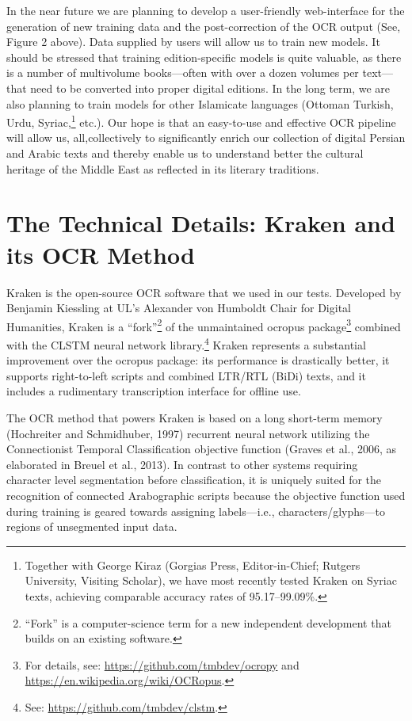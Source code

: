 In the near future we are planning to develop a user-friendly web-interface for
the generation of new training data and the post-correction of the OCR output
(See, Figure 2 above). Data supplied by users will allow us to train new
models. It should be stressed that training edition-specific models is quite
valuable, as there is a number of multivolume books—often with over a dozen
volumes per text—that need to be converted into proper digital editions. In the
long term, we are also planning to train models for other Islamicate languages
(Ottoman Turkish, Urdu, Syriac,\footnote{Together with George Kiraz (Gorgias
Press, Editor-in-Chief; Rutgers University, Visiting Scholar), we have most
recently tested Kraken on Syriac texts, achieving comparable accuracy rates of
95.17–99.09\%.} etc.). Our hope is that an easy-to-use and effective OCR
pipeline will allow us, all,collectively to significantly enrich our collection
of digital Persian and Arabic texts and thereby enable us to understand better
the cultural heritage of the Middle East as reflected in its literary
traditions.


\section{The Technical Details: Kraken and its OCR Method}

Kraken is the open-source OCR software that we used in our tests. Developed by
Benjamin Kiessling at UL’s Alexander von Humboldt Chair for Digital Humanities,
Kraken is a “fork”\footnote{“Fork” is a computer-science term for a new
independent development that builds on an existing software.} of the
unmaintained ocropus package\footnote{For details, see:
\url{https://github.com/tmbdev/ocropy} and
\url{https://en.wikipedia.org/wiki/OCRopus}.} combined with the CLSTM neural
network library.\footnote{See: \url{https://github.com/tmbdev/clstm}.} Kraken
represents a substantial improvement over the ocropus package: its performance
is drastically better, it supports right-to-left scripts and combined LTR/RTL
(BiDi) texts, and it includes a rudimentary transcription interface for offline
use.

The OCR method that powers Kraken is based on a long short-term memory
(Hochreiter and Schmidhuber, 1997) recurrent neural network utilizing the
Connectionist Temporal Classification objective function (Graves et al., 2006,
as elaborated in Breuel et al., 2013). In contrast to other systems requiring
character level segmentation before classification, it is uniquely suited for
the recognition of connected Arabographic scripts because the objective
function used during training is geared towards assigning labels—i.e.,
characters/glyphs—to regions of unsegmented input data. 

